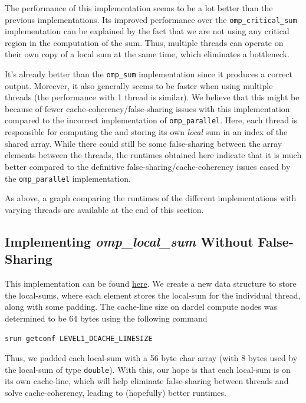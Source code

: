 \documentclass[a4paper,10pt]{article}
\begin{document}
The performance of this implementation seems to be a lot better than the previous implementations. Its improved performance over the \verb|omp_critical_sum| implementation can be explained by the fact that we are not using any critical region in the computation of the sum. Thus, multiple threads can operate on their own copy of a local sum at the same time, which eliminates a bottleneck. 

It's already better than the \verb|omp_sum| implementation since it produces a correct output. Moreever, it also generally seems to be faster when using multiple threads (the performance with 1 thread is similar). We believe that this might be because of fewer cache-coherency/false-sharing issues with this implementation compared to the incorrect implementation of \verb|omp_parallel|. Here, each thread is responsible for computing the and storing its own \textit{local} sum in an index of the shared array. While there could still be some false-sharing between the array elements between the threads, the runtimes obtained here indicate that it is much better compared to the definitive false-sharing/cache-coherency issues cased by the \verb|omp_parallel| implementation. 

As above, a graph comparing the runtimes of the different implementations with varying threads are available at the end of this section.

\subsection{Implementing \textit{omp\_local\_sum} Without False-Sharing}
This implementation can be found \href{https://github.com/paulmyr/DD2356-MethodsHPC/blob/master/3_open_mp/exercise3/omp_local_no_sharing_sum.c}{here}. We create a new data structure to store the local-sums, where each element stores the local-sum for the individual thread, along with some padding. The cache-line size on dardel compute nodes was determined to be 64 bytes using the following command 

\begin{center}
\verb|srun getconf LEVEL1_DCACHE_LINESIZE|
\end{center}

Thus, we padded each local-sum with a 56 byte char array (with 8 bytes used by the local-sum of type \verb|double|).  With this, our hope is that each local-sum is on its own cache-line, which will help eliminate false-sharing between threads and solve cache-coherency, leading to (hopefully) better runtimes. 
\end{document}
